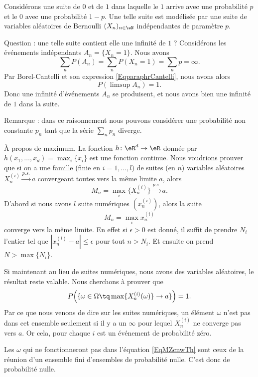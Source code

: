 \begin{example}
    Considérons une suite de \( 0\) et de \( 1\) dans laquelle le \( 1\) arrive avec une probabilité \( p\) et le \( 0\) avec une probabilité \( 1-p\). Une telle suite est modélisée par une suite de variables aléatoires de Bernoulli \( (X_n)_{n\in\eN}\) indépendantes de paramètre \( p\).

    Question : une telle suite contient elle une infinité de \( 1\) ? Considérons les événements indépendants \( A_n=\{ X_n=1 \}\). Nous avons
    \begin{equation}
        \sum_n P(A_n)=\sum_nP(X_n=1)=\sum_np=\infty.
    \end{equation}
    Par Borel-Cantelli et son expression \eqref{EqparaphrCantelli}, nous avons alors
    \begin{equation}
        P(\limsup A_n)=1.
    \end{equation}
    Donc une infinité d'événements \( A_n\) se produisent, et nous avons bien une infinité de \( 1\) dans la suite.

    Remarque : dans ce raisonnement nous pouvons considérer une probabilité non constante \( p_n\) tant que la série \( \sum_np_n\) diverge.
\end{example}

\begin{example}
    À propos de maximum. La fonction \( h\colon \eR^d\to \eR\) donnée par \( h(x_1,\ldots, x_d)=\max_i\{ x_i \}\) est une fonction continue. Nous voudrions prouver que si on a une famille (finie en \( i=1,\ldots, l\)) de suites (en \( n\)) variables aléatoires \( X^{(i)}_n\stackrel{p.s.}{\longrightarrow} a\) convergeant toutes vers la même limite \( a\), alors
    \begin{equation}
        M_n=\max_i\{ X^{(i)}_n \}\stackrel{p.s.}{\longrightarrow} a.
    \end{equation}
    D'abord si nous avons \( l\) suite numériques \( (x^{(i)}_n)\), alors la suite
    \begin{equation}
        M_n=\max_ix_n^{(i)}
    \end{equation}
    converge vers la même limite. En effet si \( \epsilon>0\) est donné, il suffit de prendre \( N_i\) l'entier tel que \( | x^{(i)}_n-a |\leq \epsilon\) pour tout \( n>N_i\). Et ensuite on prend \( N>\max\{ N_i \}\).

    Si maintenant au lieu de suites numériques, nous avons des variables aléatoires, le résultat reste valable. Nous cherchons à prouver que
    \begin{equation}\label{EqMZcnwTh}
        P\Big( \{ \omega\in \Omega\tq \max\{ X^{(i)}_n(\omega) \}\to a \} \Big)=1.
    \end{equation}
    Par ce que nous venons de dire sur les suites numériques, un élément \( \omega\) n'est pas dans cet ensemble seulement si il y a un \( \infty\) pour lequel \( X^{(i)}_n\) ne converge pas vers \( a\). Or cela, pour chaque \( i\) est un événement de probabilité zéro.

    Les \( \omega\) qui ne fonctionneront pas dans l'équation \eqref{EqMZcnwTh} sont ceux de la réunion d'un ensemble fini d'ensembles de probabilité nulle. C'est donc de probabilité nulle.
\end{example}

